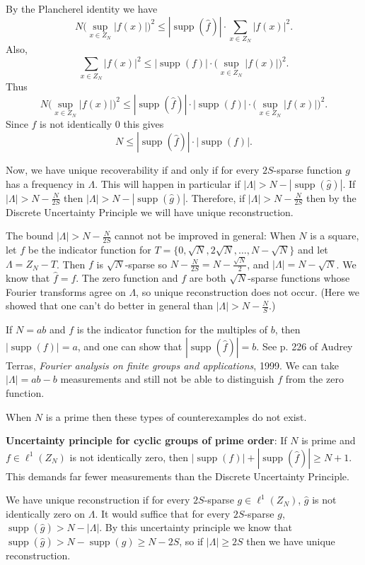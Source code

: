 \documentclass{article}
\DeclareMathOperator{\supp}{supp}
\begin{document}
By the Plancherel identity we have
\[
N\bigg(\sup_{x \in Z_N} |f(x)| \bigg)^2 \leq
|\supp(\hat{f})|
\cdot \sum_{x \in Z_N}|f(x)|^2.
\]
Also,
\[
\sum_{x\in Z_N}|f(x)|^2 \leq
|\supp(f)|\cdot \big( \sup_{x\in Z_N}|f(x)| \big)^2.
\]
Thus
\[
N\bigg(\sup_{x \in Z_N} |f(x)| \bigg)^2 \leq
|\supp(\hat{f})|
\cdot
|\supp(f)|\cdot \big( \sup_{x\in Z_N}|f(x)| \big)^2.
\]
Since $f$ is not identically $0$ this gives
\[
N \leq |\supp(\hat{f})|
\cdot
|\supp(f)|.
\]

Now, we have unique recoverability if and only if for every
$2S$-sparse function $g$ has a frequency in $\Lambda$. This will happen 
in particular if $|\Lambda|>N-|\supp(\hat{g})|$.
If
$|\Lambda|>N-\frac{N}{2S}$ then
$|\Lambda|>N-|\supp(\hat{g})|$. Therefore, if $|\Lambda|>N-\frac{N}{2S}$
then
by the Discrete Uncertainty Principle
we will have unique reconstruction.

The bound $|\Lambda|>N-\frac{N}{2S}$ cannot not be improved
in general:
When $N$ is a square, let $f$ be the indicator function for
$T=\{0,\sqrt{N},2\sqrt{N},\ldots,N-\sqrt{N}\}$
and let $\Lambda=Z_N-T$. Then $f$ is $\sqrt{N}$-sparse
so $N-\frac{N}{2S}=N-\frac{\sqrt{N}}{2}$,
and $|\Lambda|=N-\sqrt{N}$. We know that $\hat{f}=f$.
The zero function and $f$ are both $\sqrt{N}$-sparse
functions whose Fourier transforms agree on $\Lambda$, so
unique reconstruction does not occur.
(Here we showed that one can't do better in general than
$|\Lambda|>N-\frac{N}{S}$.)

If $N=ab$ and $f$ is the indicator function for
the multiples of $b$, then $|\supp(f)|=a$,
and one can show that $|\supp(\hat{f})|=b$. See
p. 226 of Audrey Terras, {\em Fourier analysis
on finite groups and applications}, 1999. We can take
$|\Lambda|=ab-b$ measurements and still not be able to distinguish
$f$ from the zero function.

When $N$ is a prime then these types of counterexamples
do not exist.

\textbf{Uncertainty principle for cyclic groups of prime order}:
If $N$ is prime and $f \in \ell^1(Z_N)$ is not identically zero, then
$|\supp(f)|+|\supp(\hat{f})| \geq N+1$. This demands far fewer measurements
than the Discrete Uncertainty Principle.

We have unique reconstruction if for every $2S$-sparse
$g \in \ell^1(Z_N)$, $\hat{g}$ is not identically zero on $\Lambda$. It
would suffice that for every $2S$-sparse $g$, $\supp(\hat{g}) > N-|\Lambda|$.
By this uncertainty principle we know that $\supp(\hat{g}) > N-\supp(g)
\geq N-2S$, so if $|\Lambda| \geq 2S$ then we have unique reconstruction.
\end{document}
